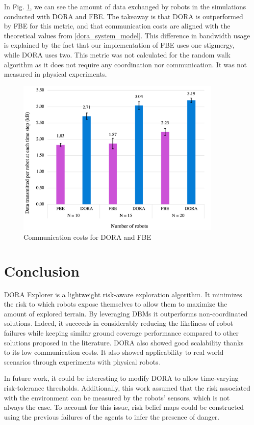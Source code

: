 In Fig. \ref{results:communicationCosts}, we can see the amount of data exchanged by robots in the simulations conducted with \ac{DORA} and \ac{FBE}. The takeaway is that \ac{DORA} is outperformed by \ac{FBE} for this metric, and that communication costs are aligned with the theoretical values from \ref{dora_system_model}. This difference in bandwidth usage is explained by the fact that our implementation of \ac{FBE} uses one stigmergy, while \ac{DORA} uses two. This metric was not calculated for the random walk algorithm as it does not require any coordination nor communication. It was not measured in physical experiments.

\begin{figure}[htbp]
    \centering
    \includegraphics[width=0.9\textwidth]{figures/dora_explorer/communication.png}
    \caption[DORA communication costs]{Communication costs for \ac{DORA} and \ac{FBE}}
    \label{results:communicationCosts}
\end{figure}

\FloatBarrier

\section{Conclusion}
\ac{DORA} Explorer is a lightweight risk-aware exploration algorithm. It minimizes the risk to which robots expose themselves to allow them to maximize the amount of explored terrain. By leveraging \ac{DBM}s it outperforms non-coordinated solutions. Indeed, it succeeds in considerably reducing the likeliness of robot failures while keeping similar ground coverage performance compared to other solutions proposed in the literature. \ac{DORA} also showed good scalability thanks to its low communication costs. It also showed applicability to real world scenarios through experiments with physical robots.

In future work, it could be interesting to modify \ac{DORA} to allow time-varying risk-tolerance thresholds. Additionally, this work assumed that the risk associated with the environment can be measured by the robots' sensors, which is not always the case. To account for this issue, risk belief maps could be constructed using the previous failures of the agents to infer the presence of danger.
